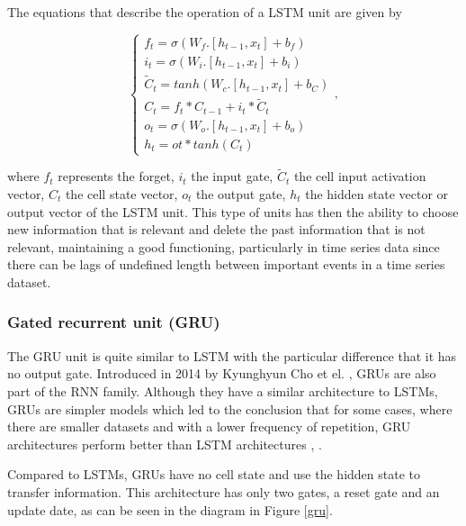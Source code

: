  


The equations that describe the operation of a \ac{LSTM} unit are given by 

\begin{equation}
    \begin{cases} 
        
        f_t=\sigma(W_f.[h_{t-1},x_t] + b_f)\\
        i_t=\sigma(W_i.[h_{t-1},x_t] + b_i)\\
        \widetilde{C}_t = tanh(W_c.[h_{t-1},x_t] + b_C)\\
        C_t=f_t*C_{t-1}+i_t* \widetilde{C}_t\\
        o_t=\sigma(W_o.[h_{t-1},x_t] + b_o)\\
        h_t=ot*tanh(C_t)
        
         
    \end{cases} ,
\end{equation}

where $f_t$ represents the forget, $i_t$ the input gate, $\widetilde{C}_t$ the cell input activation vector, ${C}_t$ the cell state vector, $o_t$ the output gate, $h_t$ the hidden state vector or output vector of the \ac{LSTM} unit. This type of units has then the ability to choose new information that is relevant and delete the past information that is not relevant, maintaining a good functioning, particularly in time series data since there can be lags of undefined length between important events in a time series dataset.

\subsubsection{Gated recurrent unit (GRU)}\label{chap3:subsubsec:gru}

The \ac{GRU} unit is quite similar to \ac{LSTM} with the particular difference that it has no output gate. Introduced in 2014 by Kyunghyun Cho et el. \cite{gru0}, \ac{GRU}s are also part of the \ac{RNN} family. Although they have a similar architecture to \ac{LSTM}s, \ac{GRU}s are simpler models which led to the conclusion that for some cases, where there are smaller datasets and with a lower frequency of repetition, \ac{GRU} architectures perform better than \ac{LSTM} architectures \cite{gru1}, \cite{gru2}.

Compared to \ac{LSTM}s, \ac{GRU}s have no cell state and use the hidden state to transfer information. This architecture has only two gates, a reset gate and an update date, as can be seen in the diagram in Figure \ref{gru}.

